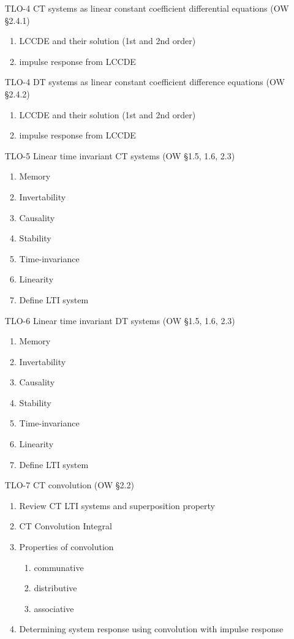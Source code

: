 \begin{enumerate}
\item[TLO-4] CT systems as linear constant coefficient differential equations (OW \S 2.4.1)
  \begin{enumerate}
  \item LCCDE and their solution (1st and 2nd order)
  \item impulse response from LCCDE
  \end{enumerate}
  
\item[TLO-4] DT systems as linear constant coefficient difference equations (OW \S 2.4.2)
  \begin{enumerate}
  \item LCCDE and their solution (1st and 2nd order)
  \item impulse response from LCCDE
  \end{enumerate}
  
\item[TLO-5] Linear time invariant CT systems (OW \S 1.5, 1.6, 2.3)
  \begin{enumerate}
  \item Memory
  \item Invertability
  \item Causality
  \item Stability
  \item Time-invariance
  \item Linearity
  \item Define LTI system
  \end{enumerate}

\item[TLO-6] Linear time invariant DT systems (OW \S 1.5, 1.6, 2.3)
  \begin{enumerate}
  \item Memory
  \item Invertability
  \item Causality
  \item Stability
  \item Time-invariance
  \item Linearity
  \item Define LTI system
  \end{enumerate}

\item[TLO-7] CT convolution (OW \S 2.2)
  \begin{enumerate}
  \item Review CT LTI systems and superposition property
  \item CT Convolution Integral
  \item Properties of convolution
    \begin{enumerate}
    \item communative 
    \item distributive
    \item associative
    \end{enumerate}
  \item Determining system response using convolution with impulse response
  \end{enumerate}


\end{enumerate}
